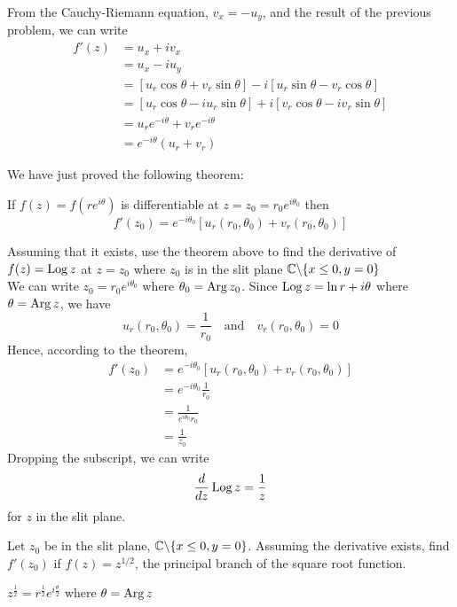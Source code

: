\documentclass[handout]{ximera}
\begin{document}
From the Cauchy-Riemann equation, $v_x = -u_y$, and the result of the previous problem, we can write
\begin{align*}
f'(z) &= u_x + iv_x\\
      & = u_x - iu_y\\
      &= \left[u_r \cos \theta + v_r \sin \theta\right] - i\left[ u_r \sin \theta - v_r \cos \theta \right]\\
      &= \left[u_r \cos \theta -i u_r \sin \theta\right] + i\left[ v_r \cos \theta  - iv_r \sin \theta\right]\\
      &= u_r e^{-i\theta} + v_r e^{-i\theta}\\
      &=  e^{-i\theta}(u_r +v_r)
\end{align*}

We have just proved the following theorem:

\begin{theorem}
If $f(z) = f\left(re^{i\theta}\right)$ is differentiable at $z = z_0 = r_0 e^{i\theta_0}$ then
\[
f'(z_0) = e^{-i\theta_0} \left[u_r(r_0, \theta_0) + v_r(r_0, \theta_0)\right]
\]
\end{theorem}

\begin{example}
Assuming that it exists, use the theorem above to find the derivative of $f(z) = \operatorname{Log} z$ 
at $z = z_0$ where $z_0$ is in the 
slit plane $\mathbb C \backslash \{x\leq 0, y=0\}$ \\
We can write $z_0 = r_0 e^{i\theta_0}$ where $\theta_0 = \operatorname{Arg} z_0$. Since $\operatorname{Log} z = \ln r + i\theta$
where $\theta = \operatorname{Arg} z$, we have 
\[
u_r(r_0,\theta_0) = \frac{1}{r_0} \quad \mbox{and} \quad v_r(r_0,\theta_0) = 0
\]
Hence, according to the theorem,
\begin{align*}
f'(z_0) &= e^{-i\theta_0}[u_r(r_0,\theta_0)+v_r(r_0,\theta_0)] \\
        &= e^{-i\theta_0}\frac{1}{r_0}\\
        &= \frac{1}{e^{i\theta_0}r_0}\\
        &= \frac{1}{z_0}
\end{align*}
Dropping the subscript, we can write
\[
\frac{d}{dz} \operatorname{Log} z = \frac{1}{z}
\]
for $z$ in the slit plane.
\end{example}

\begin{problem} 
Let $z_0$ be in the slit plane, $\mathbb C \backslash \{x\leq 0, y=0\}$. 
Assuming the derivative exists, find $f'(z_0)$ if $f(z) = z^{1/2}$, 
the principal branch of the square root function.
\begin{hint}
$\displaystyle z^{\frac12} = r^{\frac12}e^{i\frac{\theta}{2}}$ where $\theta = \operatorname{Arg} z$
\end{hint}
\end{problem}
\end{document}
